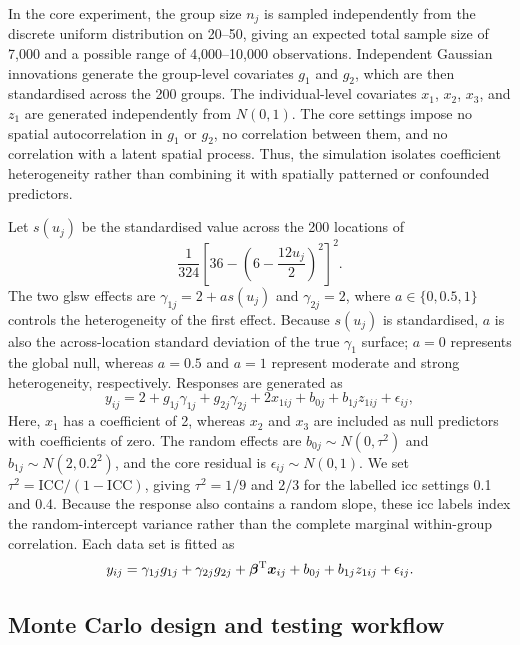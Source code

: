 \documentclass[times]{interact}
\theoremstyle{plain}%
\theoremstyle{definition}
\theoremstyle{remark}
\begin{document}
In the core experiment, the group size $n_j$ is sampled independently from the discrete uniform distribution on 20--50, giving an expected total sample size of 7,000 and a possible range of 4,000--10,000 observations.
Independent Gaussian innovations generate the group-level covariates $g_1$ and $g_2$, which are then standardised across the 200 groups.
The individual-level covariates $x_1$, $x_2$, $x_3$, and $z_1$ are generated independently from $N(0,1)$.
The core settings impose no spatial autocorrelation in $g_1$ or $g_2$, no correlation between them, and no correlation with a latent spatial process.
Thus, the simulation isolates coefficient heterogeneity rather than combining it with spatially patterned or confounded predictors.

Let $s(u_j)$ be the standardised value across the 200 locations of
\begin{equation}\label{equ:sim-hgwrtest-surface}
  \frac{1}{324}\left[36-\left(6-\frac{12u_j}{2}\right)^2\right]^2.
\end{equation}
The two \gls{glsw} effects are $\gamma_{1j}=2+a s(u_j)$ and $\gamma_{2j}=2$, where $a\in\{0,0.5,1\}$ controls the heterogeneity of the first effect.
Because $s(u_j)$ is standardised, $a$ is also the across-location standard deviation of the true $\gamma_1$ surface; $a=0$ represents the global null, whereas $a=0.5$ and $a=1$ represent moderate and strong heterogeneity, respectively.
Responses are generated as
\begin{equation}\label{equ:sim-hgwrtest-response}
  y_{ij}=2+g_{1j}\gamma_{1j}+g_{2j}\gamma_{2j}+2x_{1ij}+b_{0j}+b_{1j}z_{1ij}+\epsilon_{ij},
\end{equation}
Here, $x_1$ has a coefficient of 2, whereas $x_2$ and $x_3$ are included as null predictors with coefficients of zero.
The random effects are $b_{0j}\sim N(0,\tau^2)$ and $b_{1j}\sim N(2,0.2^2)$, and the core residual is $\epsilon_{ij}\sim N(0,1)$.
We set $\tau^2=\mathrm{ICC}/(1-\mathrm{ICC})$, giving $\tau^2=1/9$ and $2/3$ for the labelled \gls{icc} settings 0.1 and 0.4.
Because the response also contains a random slope, these \gls{icc} labels index the random-intercept variance rather than the complete marginal within-group correlation.
Each data set is fitted as
\begin{equation}\label{equ:simulation-fitted-model}
  y_{ij}=\gamma_{1j}g_{1j}+\gamma_{2j}g_{2j}+\bm{\beta}^\mathrm{T}\bm{x}_{ij}+b_{0j}+b_{1j}z_{1ij}+\epsilon_{ij}.
\end{equation}

\subsection{Monte Carlo design and testing workflow}\label{sec:simulation-workflow}
\end{document}
